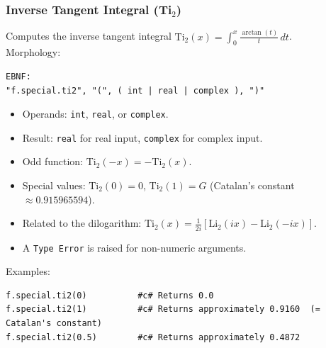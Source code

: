 \subsubsection{Inverse Tangent Integral (Ti$_2$)}
Computes the inverse tangent integral $\text{Ti}_2(x) = \int_0^x \frac{\arctan(t)}{t}\,dt$. \\
Morphology:
\begin{verbatim}
EBNF:
"f.special.ti2", "(", ( int | real | complex ), ")"
\end{verbatim}
\begin{itemize}
\item Operands: \texttt{int}, \texttt{real}, or \texttt{complex}.
\item Result: \texttt{real} for real input, \texttt{complex} for complex input.
\item Odd function: $\text{Ti}_2(-x) = -\text{Ti}_2(x)$.
\item Special values: $\text{Ti}_2(0) = 0$, $\text{Ti}_2(1) = G$ (Catalan's constant $\approx 0.915965594$).
\item Related to the dilogarithm: $\text{Ti}_2(x) = \frac{1}{2i}[\text{Li}_2(ix) - \text{Li}_2(-ix)]$.
\item A \texttt{Type Error} is raised for non-numeric arguments.
\end{itemize}
Examples:
\begin{verbatim}
f.special.ti2(0)          #c# Returns 0.0
f.special.ti2(1)          #c# Returns approximately 0.9160  (= Catalan's constant)
f.special.ti2(0.5)        #c# Returns approximately 0.4872
\end{verbatim}

